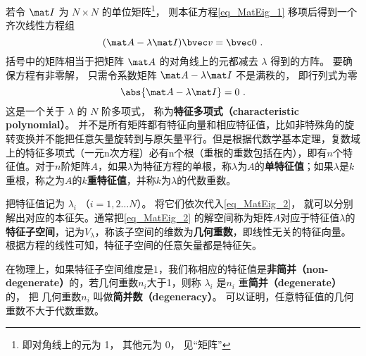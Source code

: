 若令 $\mat I$ 为 $N\times N$ 的单位矩阵\footnote{即对角线上的元为 1， 其他元为 0， 见“矩阵”}， 则本征方程\autoref{eq_MatEig_1} 移项后得到一个齐次线性方程组
\begin{equation}\label{eq_MatEig_2}
(\mat A - \lambda\mat I)\bvec v = \bvec 0~.
\end{equation}
括号中的矩阵相当于把矩阵 $\mat A$ 的对角线上的元都减去 $\lambda$ 得到的方阵。 要确保方程有非零解， 只需令系数矩阵 $\mat A - \lambda\mat I$ 不是满秩的， 即行列式为零
\begin{equation}\label{eq_MatEig_4}
\abs{\mat A - \lambda\mat I} = 0~.
\end{equation}
这是一个关于 $\lambda$ 的 $N$ 阶多项式， 称为\textbf{特征多项式（characteristic polynomial）}。 并不是所有矩阵都有特征向量和相应特征值，比如非特殊角的旋转变换并不能把任意矢量旋转到与原矢量平行。但是根据代数学基本定理，复数域上的特征多项式（一元n次方程）必有n个根（重根的重数包括在内），即有$n$个特征值。对于$n$阶矩阵$A$，如果$\lambda$为特征方程的单根，称$\lambda$为$A$的\textbf{单特征值}；如果$\lambda$是$k$重根，称之为$A$的\textbf{$k$重特征值}，并称$k$为$\lambda$的代数重数。

把特征值记为 $\lambda_i$ （$i = 1, 2\dots N$）。 将它们依次代入\autoref{eq_MatEig_2}， 就可以分别解出对应的本征矢。通常把\autoref{eq_MatEig_2} 的解空间称为矩阵$A$对应于特征值$\lambda$的\textbf{特征子空间}，记为$V_{\lambda}$，称该子空间的维数为\textbf{几何重数}，即线性无关的特征向量。根据方程的线性可知，特征子空间的任意矢量都是特征矢。

在物理上，如果特征子空间维度是$1$，我们称相应的特征值是\textbf{非简并（non-degenerate）}的，若几何重数$n_i$大于1，则称 $\lambda_i$  是$n_i$ 重\textbf{简并（degenerate）}的， 把 几何重数$n_i$ 叫做\textbf{简并数（degeneracy）}。
可以证明，任意特征值的几何重数不大于代数重数。


